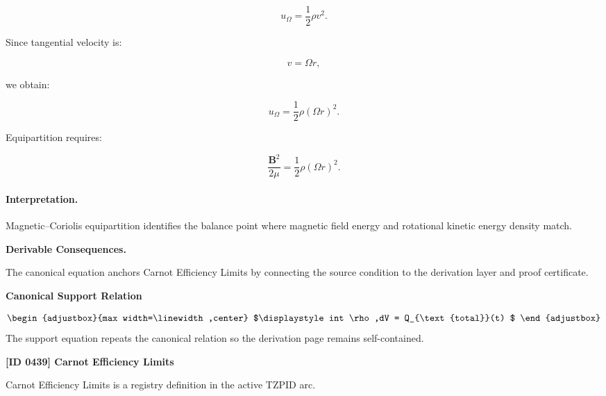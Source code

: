 \begin{equation}
u_{\Omega}
=
\frac{1}{2}\rho v^2 .
\end{equation}

Since tangential velocity is:

\begin{equation}
v=\Omega r,
\end{equation}

we obtain:

\begin{equation}
u_{\Omega}
=
\frac{1}{2}\rho(\Omega r)^2 .
\end{equation}

Equipartition requires:

\begin{equation}
\boxed{
\frac{\mathbf{B}^2}{2\mu}
=
\frac{1}{2}\rho(\Omega r)^2 .
}
\end{equation}

\paragraph{Interpretation.}
Magnetic--Coriolis equipartition identifies the balance point where magnetic field energy and rotational kinetic energy density match.

\par\vspace{0.35em}
\noindent\textbf{Derivable Consequences.}\quad
\begingroup
\footnotesize
\raggedright
The canonical equation anchors Carnot Efficiency Limits by connecting the source condition to the derivation layer and proof certificate.
\par\endgroup

\noindent\textbf{Canonical Support Relation}\par
\[
\begin{adjustbox}{max width=\linewidth,center}
$\displaystyle
int \rho,dV = Q_{\text{total}}(t)
$
\end{adjustbox}
\]
\noindent The support equation repeats the canonical relation so the derivation page remains self-contained.\par

\clearpage
\noindent\textbf{[ID 0439] Carnot Efficiency Limits}\par
\vspace{0.35em}
\begingroup\small
{}
Carnot Efficiency Limits is a registry definition in the active TZPID arc.

